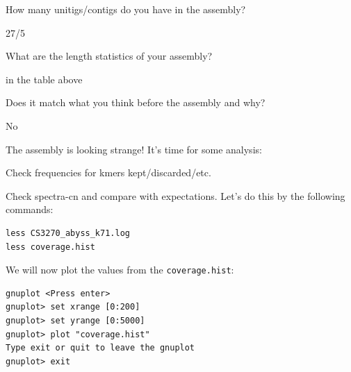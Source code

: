 \begin{questions}
How many unitigs/contigs do you have in the assembly? \\
\begin{answer}
27/5 \\
\end{answer}
What are the length statistics of your assembly? \\
\begin{answer}
in the table above \\
\end{answer}
Does it match what you think before the assembly and why? \\
\begin{answer}
No \\
\end{answer}

\end{questions}


\begin{steps}
The assembly is looking strange! It's time for some analysis:

\item Check frequencies for kmers kept/discarded/etc.
\item Check spectra-cn and compare with expectations.
Let's do this by the following commands:

\begin{lstlisting}
less CS3270_abyss_k71.log 
less coverage.hist
\end{lstlisting}
\end{steps}

\begin{steps}
We will now plot the values from the \texttt{coverage.hist}:
\begin{lstlisting}
gnuplot <Press enter>
gnuplot> set xrange [0:200]
gnuplot> set yrange [0:5000]
gnuplot> plot "coverage.hist"
Type exit or quit to leave the gnuplot
gnuplot> exit
\end{lstlisting}
\end{steps}


